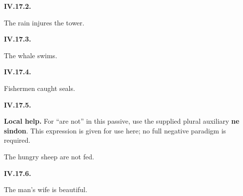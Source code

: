 \par\begin{minipage}{\linewidth}\raggedright
\textbf{IV.17.2.}

The rain injures the tower.

\end{minipage}\par\addvspace{4pt}

\par\begin{minipage}{\linewidth}\raggedright
\textbf{IV.17.3.}

The whale swims.

\end{minipage}\par\addvspace{4pt}

\par\begin{minipage}{\linewidth}\raggedright
\textbf{IV.17.4.}

Fishermen caught seals.

\end{minipage}\par\addvspace{4pt}

\par\begin{minipage}{\linewidth}\raggedright
\textbf{IV.17.5.}

\textbf{Local help.} For “are not” in this passive, use the supplied plural auxiliary \textbf{ne sindon}. This expression is given for use here; no full negative paradigm is required.

The hungry sheep are not fed.

\end{minipage}\par\addvspace{4pt}

\par\begin{minipage}{\linewidth}\raggedright
\textbf{IV.17.6.}

The man’s wife is beautiful.

\end{minipage}\par\addvspace{4pt}

